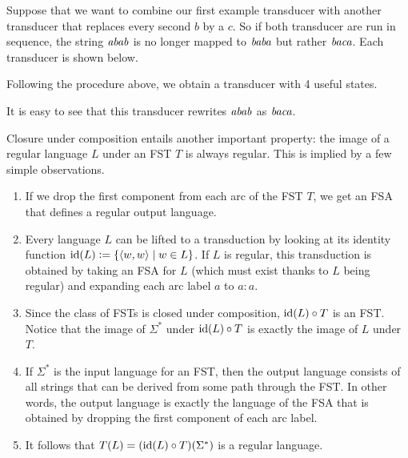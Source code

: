\begin{examplebox}
    Suppose that we want to combine our first example transducer with another transducer that replaces every second $b$ by a $c$.
    So if both transducer are run in sequence, the string $\mathit{abab}$ is no longer mapped to $\mathit{baba}$ but rather $\mathit{baca}$.
    Each transducer is shown below.
    \begin{center}
        
        
    \end{center}
    Following the procedure above, we obtain a transducer with 4 useful states.
    \begin{center}
        
    \end{center}
    It is easy to see that this transducer rewrites $\mathit{abab}$ as $\mathit{baca}$. 
\end{examplebox}
%
Closure under composition entails another important property: the image of a regular language $L$ under an FST $T$ is always regular.
This is implied by a few simple observations.
%
\begin{enumerate}
    \item If we drop the first component from each arc of the FST $T$, we get an FSA that defines a regular output language.
    \item Every language $L$ can be lifted to a transduction by looking at its identity function $\mathrm{id}(L) \mathrel{\mathop:}= \left \{ \left \langle w,w \right \rangle  \mid w \in L \right \}$.
        If $L$ is regular, this transduction is obtained by taking an FSA for $L$ (which must exist thanks to $L$ being regular) and expanding each arc label $a$ to $a:a$.
    \item Since the class of FSTs is closed under composition, $\mathrm{id}(L) \circ T$ is an FST\@.
        Notice that the image of $\Sigma^*$ under $\mathrm{id}(L) \circ T$ is exactly the image of $L$ under $T$.
    \item If $\Sigma^*$ is the input language for an FST, then the output language consists of all strings that can be derived from some path through the FST\@.
        In other words, the output language is exactly the language of the FSA that is obtained by dropping the first component of each arc label.
    \item It follows that $T(L) = (\mathrm{id}(L) \circ T)(\Sigma^*)$ is a regular language.
\end{enumerate}
%

